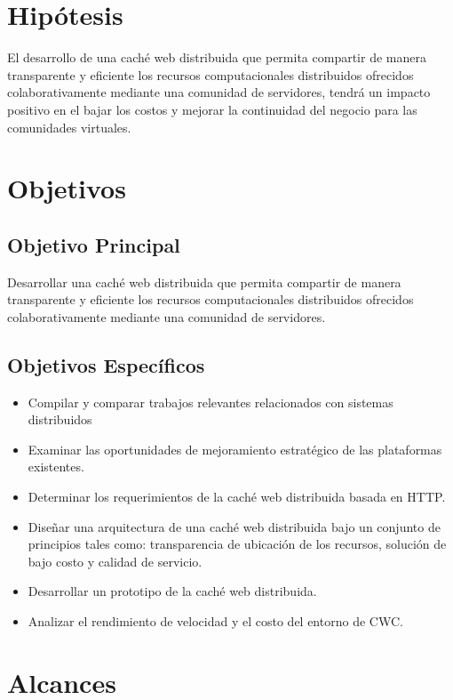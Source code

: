 \section{Hipótesis}
El desarrollo de una caché web distribuida que permita compartir de manera transparente y eficiente los recursos computacionales distribuidos ofrecidos colaborativamente mediante una comunidad de servidores, tendrá un impacto positivo en el bajar los costos y mejorar la continuidad del negocio para las comunidades virtuales.

\section{Objetivos}
\subsection{Objetivo Principal}
Desarrollar una caché web distribuida que permita compartir de manera transparente y eficiente los recursos computacionales distribuidos ofrecidos colaborativamente mediante una comunidad de servidores.

\subsection{Objetivos Específicos}
\begin{itemize}
\item Compilar y comparar trabajos relevantes relacionados con sistemas distribuidos
\item Examinar las oportunidades de mejoramiento estratégico de las plataformas existentes.
\item Determinar los requerimientos de la caché web distribuida basada en HTTP.
\item Diseñar una arquitectura de una caché web distribuida bajo un conjunto de principios tales como: transparencia de ubicación de los recursos, solución de bajo costo y calidad de servicio.
\item Desarrollar un prototipo de la caché web distribuida.
\item Analizar el rendimiento de velocidad y el costo del entorno de CWC.
\end{itemize}

\section{Alcances}

